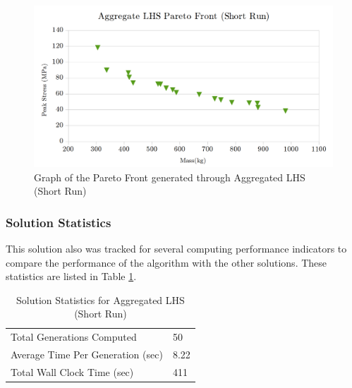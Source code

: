 \begin{figure}[!htbp]
\includegraphics[width=\textwidth]{img/pf_agg_short.png}
\caption{Graph of the Pareto Front generated through Aggregated LHS (Short Run)}
\label{fig:pfront_agg_short}
\end{figure}

\subsubsection{Solution Statistics}
This solution also was tracked for several computing performance indicators to compare the performance of the algorithm with the other solutions. These statistics are listed in Table \ref{tab:stat_agg_short}. 

\begin{table}[!htbp]
\caption{Solution Statistics for Aggregated LHS (Short Run)}
  \label{tab:stat_agg_short}
  \centering
  \begin{tabular}{|l|l|}
    \hline
	  Total Generations Computed & 50\\
    Average Time Per Generation (sec) & 8.22\\
    Total Wall Clock Time (sec)	 & 411\\
    \hline
  \end{tabular}
\end{table}

